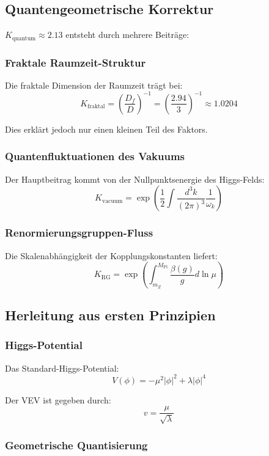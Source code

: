 \documentclass[12pt,a4paper]{article}
\begin{document}
	\subsection{Quantengeometrische Korrektur}
	
	$K_{\text{quantum}} \approx 2.13$ entsteht durch mehrere Beiträge:
	
	\subsubsection{Fraktale Raumzeit-Struktur}
	
	Die fraktale Dimension der Raumzeit trägt bei:
	\[
	K_{\text{fraktal}} = \left(\frac{D_f}{D}\right)^{-1} = \left(\frac{2.94}{3}\right)^{-1} \approx 1.0204
	\]
	
	Dies erklärt jedoch nur einen kleinen Teil des Faktors.
	
	\subsubsection{Quantenfluktuationen des Vakuums}
	
	Der Hauptbeitrag kommt von der Nullpunktsenergie des Higgs-Felds:
	\[
	K_{\text{vacuum}} = \exp\left(\frac{1}{2}\int \frac{d^3k}{(2\pi)^3} \frac{1}{\omega_k}\right)
	\]
	
	\subsubsection{Renormierungsgruppen-Fluss}
	
	Die Skalenabhängigkeit der Kopplungskonstanten liefert:
	\[
	K_{\text{RG}} = \exp\left(\int_{m_Z}^{M_{\text{Pl}}} \frac{\beta(g)}{g} d\ln\mu\right)
	\]
	
	\subsection{Herleitung aus ersten Prinzipien}
	
	\subsubsection{Higgs-Potential}
	
	Das Standard-Higgs-Potential:
	\[
	V(\phi) = -\mu^2|\phi|^2 + \lambda|\phi|^4
	\]
	
	Der VEV ist gegeben durch:
	\[
	v = \frac{\mu}{\sqrt{\lambda}}
	\]
	
	\subsubsection{Geometrische Quantisierung}
	
\end{document}
